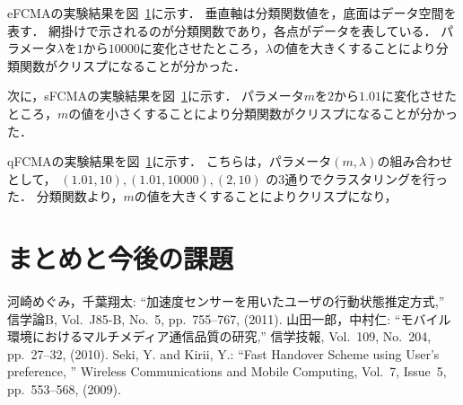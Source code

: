 \documentclass[twocolumn, a4paper]{icethesisabst}
\begin{document}
eFCMAの実験結果を図~\ref{}に示す．
垂直軸は分類関数値を，底面はデータ空間を表す．
網掛けで示されるのが分類関数であり，各点がデータを表している．
パラメータ$\lambda$を$1$から$10000$に変化させたところ，$\lambda$の値を大きくすることにより分類関数がクリスプになることが分かった．

次に，sFCMAの実験結果を図~\ref{}に示す．
パラメータ$m$を$2$から$1.01$に変化させたところ，$m$の値を小さくすることにより分類関数がクリスプになることが分かった．

qFCMAの実験結果を図~\ref{}に示す．
こちらは，パラメータ$(m, \lambda)$の組み合わせとして，
$(1.01, 10), (1.01, 10000), (2, 10)$
の3通りでクラスタリングを行った．
分類関数より，$m$の値を大きくすることによりクリスプになり，

\section{まとめと今後の課題}

\begin{thebibliography}{99}
河崎めぐみ，千葉翔太:
``加速度センサーを用いたユーザの行動状態推定方式,''
信学論B, Vol.~J85-B, No.~5, pp.~755--767, (2011).
山田一郎，中村仁:
``モバイル環境におけるマルチメディア通信品質の研究,''
信学技報, Vol.~109, No.~204, pp.~27--32, (2010).
Seki, Y. and Kirii, Y.:
``Fast Handover Scheme using User's preference, ''
Wireless Communications and Mobile Computing,
Vol.~7, Issue~5, pp.~553--568, (2009).
\end{thebibliography}
\end{document}
